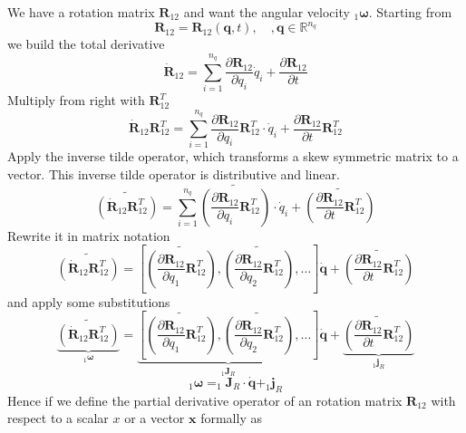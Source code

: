 \documentclass{report}
\newcommand{\bs}[1]{\boldsymbol #1}
\begin{document}
We have a rotation matrix $\bs{R}_{12}$ and want the angular velocity $_1\bs{\omega}$. Starting from
\begin{equation}
\bs{R}_{12}=\bs{R}_{12}(\bs{q},t),\quad,\bs{q}\in\mathbb{R}^{n_q}
\end{equation}
we build the total derivative
\begin{equation}
\dot{\bs{R}}_{12}=\sum_{i=1}^{n_q} \frac{\partial \bs{R}_{12}}{\partial q_i}\dot{q}_i + \frac{\partial \bs{R}_{12}}{\partial t}
\end{equation}
Multiply from right with $\bs{R}_{12}^T$
\begin{equation}
\dot{\bs{R}}_{12}\bs{R}_{12}^T=\sum_{i=1}^{n_q} \frac{\partial \bs{R}_{12}}{\partial q_i}\bs{R}_{12}^T\cdot\dot{q}_i + \frac{\partial \bs{R}_{12}}{\partial t}\bs{R}_{12}^T
\end{equation}
Apply the inverse tilde operator, which transforms a skew symmetric matrix to a vector. This inverse tilde operator is distributive and linear.
\begin{equation}
\widetilde{\left(\dot{\bs{R}}_{12}\bs{R}_{12}^T\right)}=\sum_{i=1}^{n_q} \widetilde{\left(\frac{\partial \bs{R}_{12}}{\partial q_i}\bs{R}_{12}^T\right)}\cdot\dot{q}_i + \widetilde{\left(\frac{\partial \bs{R}_{12}}{\partial t}\bs{R}_{12}^T\right)}
\end{equation}
Rewrite it in matrix notation
\begin{equation}
\widetilde{\left(\dot{\bs{R}}_{12}\bs{R}_{12}^T\right)}=\left[\widetilde{\left(\frac{\partial \bs{R}_{12}}{\partial q_1}\bs{R}_{12}^T\right)},\widetilde{\left(\frac{\partial \bs{R}_{12}}{\partial q_2}\bs{R}_{12}^T\right)},\dots\right]\dot{\bs{q}} + \widetilde{\left(\frac{\partial \bs{R}_{12}}{\partial t}\bs{R}_{12}^T\right)}
\end{equation}
and apply some substitutions
\begin{equation}
\underbrace{\widetilde{\left(\dot{\bs{R}}_{12}\bs{R}_{12}^T\right)}}_{_1\bs{\omega}}=\underbrace{\left[\widetilde{\left(\frac{\partial \bs{R}_{12}}{\partial q_1}\bs{R}_{12}^T\right)},\widetilde{\left(\frac{\partial \bs{R}_{12}}{\partial q_2}\bs{R}_{12}^T\right)},\dots\right]}_{_1\bs{J}_R}\dot{\bs{q}} + \underbrace{\widetilde{\left(\frac{\partial \bs{R}_{12}}{\partial t}\bs{R}_{12}^T\right)}}_{_1\bs{j}_R}
\end{equation}
\begin{equation}
_1\bs{\omega}=_1\bs{J}_R\cdot \dot{\bs{q}} + _1\bs{j}_R
\end{equation}
Hence if we define the partial derivative operator of an rotation matrix $\bs{R}_{12}$ with respect to a scalar $x$ or a vector $\bs{x}$ formally as
\end{document}
